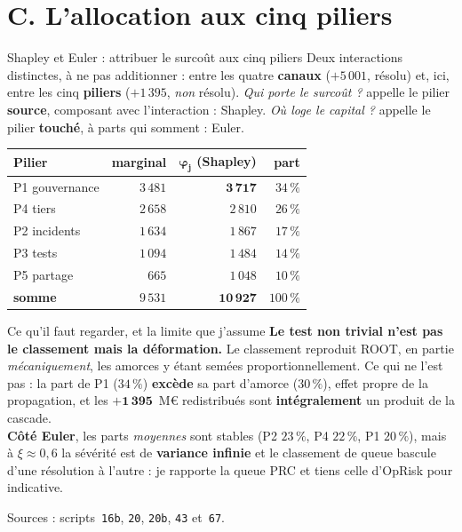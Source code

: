 \documentclass[11pt]{beamer}
\begin{document}
\section*{C. L'allocation aux cinq piliers}

\begin{frame}{Shapley et Euler : attribuer le surcoût aux cinq piliers}
\scriptsize
\alert{Deux interactions distinctes, à ne pas additionner :} entre les quatre \textbf{canaux}
($+5\,001$, résolu) et, ici, entre les cinq \textbf{piliers} ($+1\,395$, \emph{non} résolu).
\emph{Qui porte le surcoût ?} appelle le pilier \textbf{source}, composant avec l'interaction :
Shapley. \emph{Où loge le capital ?} appelle le pilier \textbf{touché}, à parts qui somment : Euler.
\vspace{-1mm}
\begin{center}\scriptsize
\begin{tabular}{@{}l rrr@{}}
\toprule
\textbf{Pilier} & \textbf{marginal} & $\boldsymbol{\varphi_j}$ \textbf{(Shapley)} & \textbf{part} \\
\midrule
P1 gouvernance & $3\,481$ & $\mathbf{3\,717}$ & $34\,\%$ \\
P4 tiers & $2\,658$ & $2\,810$ & $26\,\%$ \\
P2 incidents & $1\,634$ & $1\,867$ & $17\,\%$ \\
P3 tests & $1\,094$ & $1\,484$ & $14\,\%$ \\
P5 partage & $665$ & $1\,048$ & $10\,\%$ \\
\midrule
\textbf{somme} & $9\,531$ & $\mathbf{10\,927}$ & $100\,\%$ \\
\bottomrule
\end{tabular}
\end{center}
\vspace{-1mm}
\begin{block}{Ce qu'il faut regarder, et la limite que j'assume}
\textbf{Le test non trivial n'est pas le classement mais la déformation.} Le classement reproduit
ROOT, en partie \emph{mécaniquement}, les amorces y étant semées proportionnellement. Ce qui ne
l'est pas : la part de P1 ($34\,\%$) \textbf{excède} sa
part d'amorce ($30\,\%$), effet propre de la propagation, et les $\mathbf{+1\,395}$~M\euro{}
redistribués sont \textbf{intégralement} un produit de la cascade.\\[3pt]
\textbf{Côté Euler}, les parts \emph{moyennes} sont stables (P2 $23\,\%$, P4 $22\,\%$, P1
$20\,\%$), mais à $\xi\approx0{,}6$ la sévérité est de \textbf{variance infinie} et le classement
de queue bascule d'une résolution à l'autre : je rapporte la queue PRC et tiens celle d'OpRisk
pour indicative.
\end{block}
\vspace{-2mm}
{\scriptsize Sources : scripts~\texttt{16b}, \texttt{20}, \texttt{20b}, \texttt{43}
et~\texttt{67}.}
\end{frame}
\end{document}
